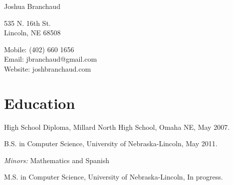 \documentclass[10pt,letterpaper]{article}
\def\name{Joshua Branchaud}
\renewenvironment{itemize}{
  \begin{list}{}{
    \setlength{\leftmargin}{1.5em}
    \setlength{\itemsep}{0.25em}
    \setlength{\parskip}{0pt}
    \setlength{\parsep}{0.25em}
  }
}{
  \end{list}
}
\begin{document}
{\huge \name}


\vspace{0.25in}

\begin{minipage}[t]{0.5\textwidth}
  535 N. 16th St. \\
  Lincoln, NE 68508
\end{minipage}
\begin{minipage}[t]{0.5\textwidth}
  Mobile: (402) 660 1656 \\
  Email: jbranchaud@gmail.com \\
  Website: joshbranchaud.com \\
\end{minipage}


%

\section*{Education}

\begin{itemize}
  \item High School Diploma, Millard North High School, Omaha NE, May 2007.

  \item B.S. in Computer Science, University of Nebraska-Lincoln, May 2011.

    \begin{itemize}
        \item \textit{Minors:} Mathematics and Spanish
    \end{itemize}
    
    \item M.S. in Computer Science, University of Nebraska-Lincoln, In
    progress.

\end{itemize}
\end{document}
